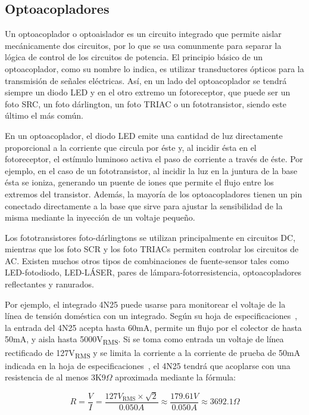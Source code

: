 %
%


\subsection{Optoacopladores}%
\label{seq:intro-opto}
Un optoacoplador o optoaislador es un circuito integrado que permite aislar mecánicamente dos circuitos, por lo que se usa comunmente para separar la lógica de control de los circuitos de potencia.
El principio básico de un optoacoplador, como su nombre lo indica, es utilizar transductores ópticos para la transmisión de señales eléctricas.
Así, en un lado del optoacoplador se tendrá siempre un diodo LED y en el otro extremo un fotoreceptor, que puede ser un foto SRC, un foto dárlington, un foto TRIAC o un fototransistor, siendo este último el más común.

En un optoacoplador, el diodo LED emite una cantidad de luz directamente proporcional a la corriente que circula por éste y, al incidir ésta en el fotoreceptor, el estímulo luminoso activa el paso de corriente a través de éste.
Por ejemplo, en el caso de un fototransistor, al incidir la luz en la juntura de la base ésta se ioniza, generando un puente de iones que permite el flujo entre los extremos del transistor.
Además, la mayoría de los optoacopladores tienen un pin conectado directamente a la base que sirve para ajustar la sensibilidad de la misma mediante la inyección de un voltaje pequeño.

Los fototransistores foto-dárlingtons se utilizan principalmente en circuitos DC, mientras que los foto SCR y los foto TRIACs permiten controlar los circuitos de AC.
Existen muchos otros tipos de combinaciones de fuente-sensor tales como LED-fotodiodo, LED-LÁSER, pares de lámpara-fotorresistencia, optoacopladores reflectantes y ranurados.

Por ejemplo, el integrado 4N25 puede usarse para monitorear el voltaje de la línea de tensión doméstica con un integrado.
Según su hoja de especificaciones~, la entrada del 4N25 acepta hasta 60mA, permite un flujo por el colector de hasta 50mA, y aisla hasta 5000V\textsubscript{RMS}.
Si se toma como entrada un voltaje de línea rectificado de 127V\textsubscript{RMS} y se limita la corriente a la corriente de prueba de 50mA indicada en la hoja de especificaciones~, el 4N25 tendrá que acoplarse con una resistencia de al menos 3K9$\Omega$ aproximada mediante la fórmula:

\begin{equation*}
R=\frac{V}{I}=\frac{127V_\text{RMS}\times\sqrt{2}}{0.050A}
\approx \frac{179.61V}{0.050A} \approx 3692.1\Omega
\end{equation*}
